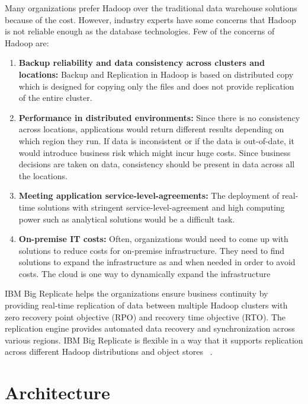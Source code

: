 Many organizations prefer Hadoop over the traditional data warehouse solutions
because of the cost. However, industry experts have some concerns that Hadoop is
not reliable enough as the database technologies. Few of the concerns of Hadoop
are:
\begin{enumerate}
\item \textbf{Backup reliability and data  consistency across clusters and
locations:} Backup and Replication in Hadoop is based on distributed copy which 
is designed for copying only the files and does not provide replication of the
entire cluster.
\item \textbf{Performance in distributed environments:} Since there is no
consistency across locations, applications would return different results
depending on which region they run. If data is inconsistent or if the data is
out-of-date, it would introduce business risk which might incur huge costs. 
Since business decisions are taken on data, consistency should be present in 
data across all the locations. 
\item \textbf{Meeting application service-level-agreements:} The deployment of
real-time solutions with stringent service-level-agreement and high computing
power such as analytical solutions would be a difficult task. 
\item \textbf{On-premise IT costs:} Often, organizations would need to come up
with solutions to reduce costs for on-premise infrastructure. They need to find
solutions to expand the infrastructure as and when needed in order to avoid 
costs. The cloud is one way to dynamically expand the infrastructure
\end{enumerate}
IBM Big Replicate helps the organizations ensure business continuity by
providing real-time replication of data between multiple Hadoop clusters with 
zero recovery point objective (RPO) and recovery time objective (RTO). The
replication engine provides automated data recovery and synchronization across 
various regions.  IBM Big Replicate is flexible in a way that it supports 
replication across different Hadoop distributions and object stores
~\cite{hid-sp18-408-IBMBigReplicate-intro}.

\section{Architecture}

